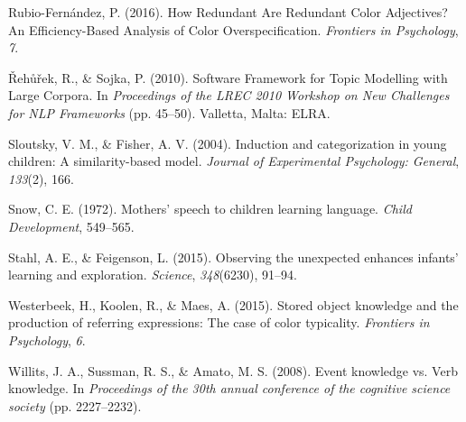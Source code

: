 \documentclass[10pt, letterpaper]{article}
\newlength{\cslhangindent}
\newenvironment{cslreferences}%
  {\setlength{\parindent}{0pt}%
  \everypar{\setlength{\hangindent}{\cslhangindent}}\ignorespaces}%
  {\par}
\begin{document}
\begin{cslreferences}
\leavevmode\hypertarget{ref-rubio-fernandez2016}{}%
Rubio-Fernández, P. (2016). How Redundant Are Redundant Color
Adjectives? An Efficiency-Based Analysis of Color Overspecification.
\emph{Frontiers in Psychology}, \emph{7}.

\leavevmode\hypertarget{ref-rehurek2010}{}%
Řehůřek, R., \& Sojka, P. (2010). Software Framework for Topic Modelling
with Large Corpora. In \emph{Proceedings of the LREC 2010 Workshop on
New Challenges for NLP Frameworks} (pp. 45--50). Valletta, Malta: ELRA.

\leavevmode\hypertarget{ref-sloutsky2004}{}%
Sloutsky, V. M., \& Fisher, A. V. (2004). Induction and categorization
in young children: A similarity-based model. \emph{Journal of
Experimental Psychology: General}, \emph{133}(2), 166.

\leavevmode\hypertarget{ref-snow1972}{}%
Snow, C. E. (1972). Mothers' speech to children learning language.
\emph{Child Development}, 549--565.

\leavevmode\hypertarget{ref-stahl2015}{}%
Stahl, A. E., \& Feigenson, L. (2015). Observing the unexpected enhances
infants' learning and exploration. \emph{Science}, \emph{348}(6230),
91--94.

\leavevmode\hypertarget{ref-westerbeek2015}{}%
Westerbeek, H., Koolen, R., \& Maes, A. (2015). Stored object knowledge
and the production of referring expressions: The case of color
typicality. \emph{Frontiers in Psychology}, \emph{6}.

\leavevmode\hypertarget{ref-willits2008}{}%
Willits, J. A., Sussman, R. S., \& Amato, M. S. (2008). Event knowledge
vs. Verb knowledge. In \emph{Proceedings of the 30th annual conference
of the cognitive science society} (pp. 2227--2232).
\end{cslreferences}


\end{document}
